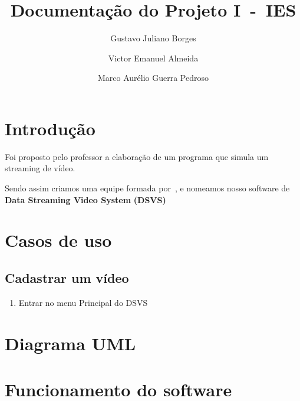 \documentclass[12pt, a4paper]{article}
\author{Gustavo Juliano Borges \and Victor Emanuel Almeida \and Marco Aurélio Guerra Pedroso}
\title{Documentação do Projeto I~-~IES}
\begin{document}
\begin{titlepage}
\maketitle\thispagestyle{empty}
\end{titlepage}
\section{Introdução}

Foi proposto pelo professor a elaboração de um programa que simula um streaming de vídeo.

Sendo assim criamos uma equipe formada por~\textbf{\theauthor}, e nomeamos nosso software de \textbf{Data Streaming Video System} \textbf{(DSVS)}

\section{Casos de uso}
\subsection{Cadastrar um vídeo}
\begin{enumerate}
	\item Entrar no menu Principal do DSVS
\end{enumerate}

\section{Diagrama UML}

\section{Funcionamento do software}
\end{document}
